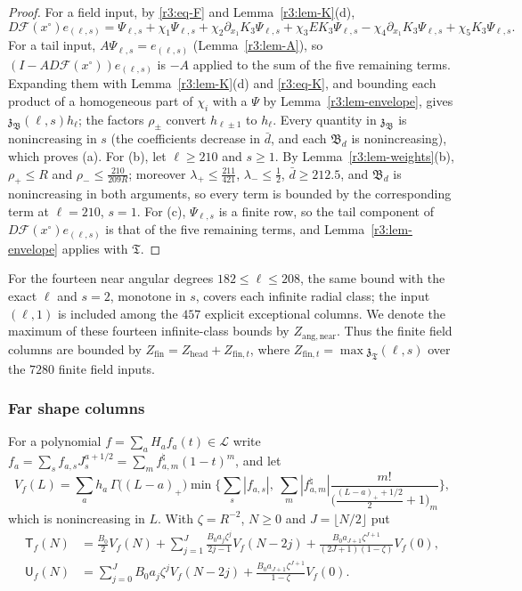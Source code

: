 \documentclass[11pt]{amsart}
\theoremstyle{definition}
\theoremstyle{remark}
\numberwithin{equation}{section}
\newcommand{\Fc}{\mathcal{F}}
\begin{document}
\begin{proof}
For a field input, by \eqref{r3:eq-F} and Lemma~\ref{r3:lem-K}(d),
\[
D\Fc(x^\circ)e_{(\ell,s)}=\Psi_{\ell,s}+\chi_1\Psi_{\ell,s}+\chi_2\partial_{x_1}K_3\Psi_{\ell,s}+\chi_3EK_3\Psi_{\ell,s}-\chi_4\partial_{x_1}K_3\Psi_{\ell,s}+\chi_5K_3\Psi_{\ell,s} .
\]
For a tail input, $A\Psi_{\ell,s}=e_{(\ell,s)}$ (Lemma~\ref{r3:lem-A}), so $(I-AD\Fc(x^\circ))e_{(\ell,s)}$ is $-A$ applied to the sum of the five remaining terms. Expanding them with Lemma~\ref{r3:lem-K}(d) and \eqref{r3:eq-K}, and bounding each product of a homogeneous part of $\chi_i$ with a $\Psi$ by Lemma~\ref{r3:lem-envelope}, gives $\mathfrak z_{\mathfrak B}(\ell,s)h_\ell$; the factors $\rho_\pm$ convert $h_{\ell\pm1}$ to $h_\ell$. Every quantity in $\mathfrak z_{\mathfrak B}$ is nonincreasing in $s$ (the coefficients decrease in $\bar d$, and each $\mathfrak B_d$ is nonincreasing), which proves (a). For (b), let $\ell\geq210$ and $s\geq1$. By Lemma~\ref{r3:lem-weights}(b), $\rho_+\leq R$ and $\rho_-\leq\frac{210}{209R}$; moreover $\lambda_+\leq\frac{211}{421}$, $\lambda_-\leq\frac12$, $\bar d\geq212.5$, and $\mathfrak B_d$ is nonincreasing in both arguments, so every term is bounded by the corresponding term at $\ell=210$, $s=1$. For (c), $\Psi_{\ell,s}$ is a finite row, so the tail component of $D\Fc(x^\circ)e_{(\ell,s)}$ is that of the five remaining terms, and Lemma~\ref{r3:lem-envelope} applies with $\mathfrak T$.
\end{proof}

For the fourteen near angular degrees $182\leq\ell\leq208$, the same bound with the exact $\ell$ and $s=2$, monotone in $s$, covers each infinite radial class; the input $(\ell,1)$ is included among the $457$ explicit exceptional columns. We denote the maximum of these fourteen infinite-class bounds by $Z_{\mathrm{ang,near}}$. Thus the finite field columns are bounded by $Z_{\mathrm{fin}}=Z_{\mathrm{head}}+Z_{\mathrm{fin},t}$, where $Z_{\mathrm{fin},t}=\max\mathfrak z_{\mathfrak T}(\ell,s)$ over the $7280$ finite field inputs.

\subsubsection*{Far shape columns}
For a polynomial $f=\sum_aH_af_a(t)\in\mathcal L$ write $f_a=\sum_sf_{a,s}J^{a+1/2}_s=\sum_mf^\natural_{a,m}(1-t)^m$, and let
\[
V_f(L)=\sum_ah_a\,\Gamma\big((L-a)_+\big)\min\Big\{\sum_s|f_{a,s}|,\ \sum_m|f^\natural_{a,m}|\frac{m!}{\big(\frac{(L-a)_++1/2}2+1\big)_m}\Big\},
\]
which is nonincreasing in $L$. With $\zeta=R^{-2}$, $N\geq0$ and $J=\lfloor N/2\rfloor$ put
\begin{align*}
\mathsf T_f(N)&=\frac{B_0}2V_f(N)+\sum_{j=1}^J\frac{B_0a_j\zeta^j}{2j-1}V_f(N-2j)+\frac{B_0a_{J+1}\zeta^{J+1}}{(2J+1)(1-\zeta)}V_f(0),\\
\mathsf U_f(N)&=\sum_{j=0}^JB_0a_j\zeta^jV_f(N-2j)+\frac{B_0a_{J+1}\zeta^{J+1}}{1-\zeta}V_f(0).
\end{align*}
\end{document}
